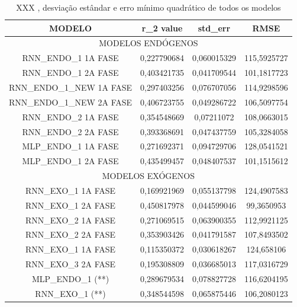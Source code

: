 \documentclass[	12pt, Times, openright, twoside, a4paper, english, brazil]{abntex2}
\begin{document}
	    
	    
	    
	    \begin{table}[!ht]
        \caption{XXX , desviação estândar e erro mínimo quadrático de todos os modelos}
        \begin{adjustbox}{width=0.8\columnwidth,center}
           \begin{tabular}{ |c | c| c | c| }
     \rowcolor{gray!50}
   {	MODELO} & r\_2 value &	std\_err & RMSE \\ \hline
     \multicolumn{4}{c}{	MODELOS ENDÓGENOS }  \\ \hline
RNN\_ENDO\_1 1A FASE&	0,227790684	&0,060015329&	115,5925727\\ \hline
RNN\_ENDO\_1 2A FASE&	0,403421735	&0,041709544&	101,1817723\\ \hline
RNN\_ENDO\_1\_NEW 1A FASE&	0,297403256&	0,076707056&	114,9298596\\ \hline
RNN\_ENDO\_1\_NEW 2A FASE&	0,406723755&	0,049286722&	106,5097754\\ \hline
RNN\_ENDO\_2 1A FASE&	0,354548669	&0,07211072&	108,0663015\\ \hline
RNN\_ENDO\_2 2A FASE&	0,393368691	&0,047437759&	105,3284058\\ \hline
MLP\_ENDO\_1 1A FASE&	0,271692371	&0,094729706&	128,0541521\\ \hline
MLP\_ENDO\_1 2A FASE&	0,435499457	&0,048407537&	101,1515612\\ \hline
	\multicolumn{4}{c}{ MODELOS EXÓGENOS }\\ \hline
RNN\_EXO\_1 1A FASE &	0,169921969	&0,055137798&	124,4907583\\ \hline
RNN\_EXO\_1 2A FASE	&0,450817978&	0,044599046	&99,3650953\\ \hline
RNN\_EXO\_2 1A FASE&	0,271069515&	0,063900355&	112,9921125\\ \hline
RNN\_EXO\_2 2A FASE&	0,353903426&	0,041791587	&107,8493502\\ \hline
RNN\_EXO\_1 1A FASE	&0,115350372&	0,030618267	&124,658106\\ \hline
RNN\_EXO\_3 2A FASE&	0,195308809	&0,036685013&	117,0316729\\ \hline
MLP\_ENDO\_1 (**)&	0,289679534	&0,078827728&	116,6204195\\ \hline
RNN\_EXO\_1  (**)&	0,348544598	&0,065875446&	106,2080123 \\ \hline
\end{tabular} \end{adjustbox} \end{table} 
	    
\end{document}
